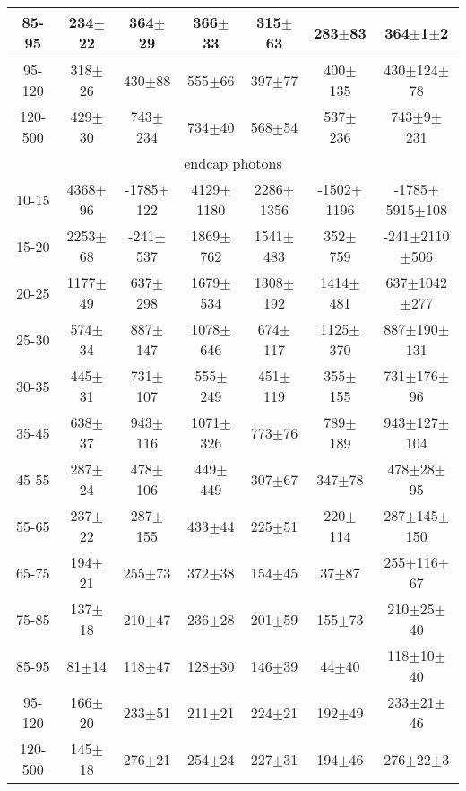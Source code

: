 \begin{table}[h]
\begin{center}
\begin{tabular}{|c|c|c|c|c|c|c|}
    85-95 & 234$\pm$22 & 364$\pm$29 & 366$\pm$33 & 315$\pm$63 & 283$\pm$83 &364$\pm$1$\pm$2  \\ \hline
    95-120 & 318$\pm$26 & 430$\pm$88 & 555$\pm$66 & 397$\pm$77 & 400$\pm$135 &430$\pm$124$\pm$78  \\ \hline
    120-500 & 429$\pm$30 & 743$\pm$234 & 734$\pm$40 & 568$\pm$54 & 537$\pm$236 &743$\pm$9$\pm$231  \\ \hline
    \multicolumn{7}{|c|}{endcap photons} \\ \hline
    10-15 & 4368$\pm$96 & -1785$\pm$122 & 4129$\pm$1180 & 2286$\pm$1356 & -1502$\pm$1196 &-1785$\pm$5915$\pm$108  \\ \hline
    15-20 & 2253$\pm$68 & -241$\pm$537 & 1869$\pm$762 & 1541$\pm$483 & 352$\pm$759 &-241$\pm$2110$\pm$506  \\ \hline
    20-25 & 1177$\pm$49 & 637$\pm$298 & 1679$\pm$534 & 1308$\pm$192 & 1414$\pm$481 &637$\pm$1042$\pm$277  \\ \hline
    25-30 & 574$\pm$34 & 887$\pm$147 & 1078$\pm$646 & 674$\pm$117 & 1125$\pm$370 &887$\pm$190$\pm$131  \\ \hline
    30-35 & 445$\pm$31 & 731$\pm$107 & 555$\pm$249 & 451$\pm$119 & 355$\pm$155 &731$\pm$176$\pm$96  \\ \hline
    35-45 & 638$\pm$37 & 943$\pm$116 & 1071$\pm$326 & 773$\pm$76 & 789$\pm$189 &943$\pm$127$\pm$104  \\ \hline
    45-55 & 287$\pm$24 & 478$\pm$106 & 449$\pm$449 & 307$\pm$67 & 347$\pm$78 &478$\pm$28$\pm$95  \\ \hline
    55-65 & 237$\pm$22 & 287$\pm$155 & 433$\pm$44 & 225$\pm$51 & 220$\pm$114 &287$\pm$145$\pm$150  \\ \hline
    65-75 & 194$\pm$21 & 255$\pm$73 & 372$\pm$38 & 154$\pm$45 & 37$\pm$87 &255$\pm$116$\pm$67  \\ \hline
    75-85 & 137$\pm$18 & 210$\pm$47 & 236$\pm$28 & 201$\pm$59 & 155$\pm$73 &210$\pm$25$\pm$40  \\ \hline
    85-95 & 81$\pm$14 & 118$\pm$47 & 128$\pm$30 & 146$\pm$39 & 44$\pm$40 &118$\pm$10$\pm$40  \\ \hline
    95-120 & 166$\pm$20 & 233$\pm$51 & 211$\pm$21 & 224$\pm$21 & 192$\pm$49 &233$\pm$21$\pm$46  \\ \hline
    120-500 & 145$\pm$18 & 276$\pm$21 & 254$\pm$24 & 227$\pm$31 & 194$\pm$46 &276$\pm$22$\pm$3  \\ \hline
  \end{tabular}
  \label{tab:diff_ways_to_fit_phoEt_electron}
  \end{center}
\end{table}

